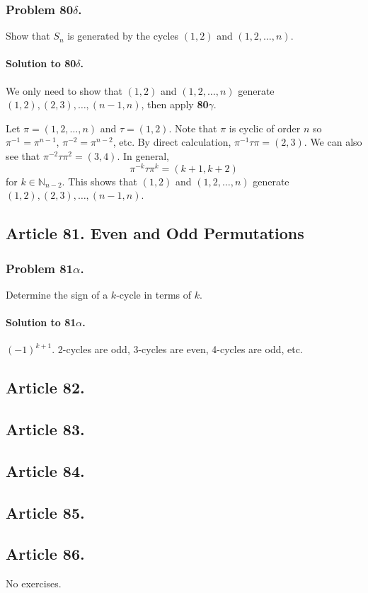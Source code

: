 \subsubsection{Problem 80$\delta$.}
Show that $S_n$ is generated by the cycles $(1,2)$ and $(1,2, \dots, n)$.

\paragraph*{Solution to 80$\delta$.}
We only need to show that $(1,2)$ and $(1,2, \dots, n)$ generate
$(1,2), (2,3), \dots, (n-1,n)$, then apply \textbf{80$\gamma$}.

Let $\pi = (1,2,\dots,n)$ and $\tau =(1,2)$. Note that $\pi$ is cyclic of order
$n$ so $\pi^{-1} = \pi^{n-1}$, $\pi^{-2} = \pi^{n-2}$, etc.
By direct calculation, $\pi^{-1}\tau\pi = (2,3)$. We can also see that
$\pi^{-2}\tau\pi^2 = (3,4)$. In general, $$\pi^{-k}\tau\pi^k = (k+1,k+2)$$ for
$k \in \mathbb{N}_{n-2}$. This shows that $(1,2)$ and $(1,2, \dots, n)$ generate
$(1,2), (2,3), \dots, (n-1,n)$.
\subsection{Article 81. Even and Odd Permutations}
\subsubsection{Problem 81$\alpha$.}
Determine the sign of a $k$-cycle in terms of $k$.

\paragraph*{Solution to 81$\alpha$.}
$(-1)^{k+1}$. 2-cycles are odd, 3-cycles are even, 4-cycles are odd, etc.

\subsection{Article 82.}

\subsection{Article 83.}

\subsection{Article 84.}

\subsection{Article 85.}

\subsection{Article 86.}

No exercises.

